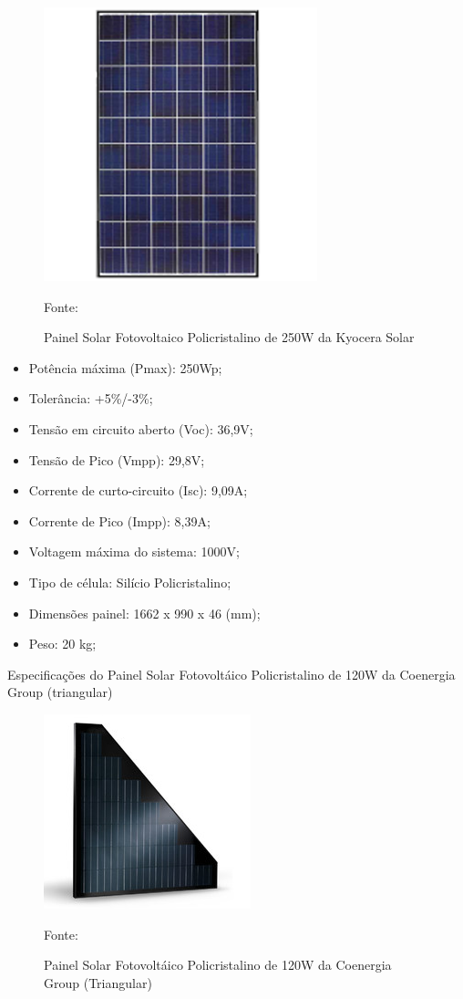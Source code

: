 \begin{figure}[H]
	\centering
	\label{Painel Solar Fotovoltaico Policristalino de 250W da Kyocera Solar}
		\includegraphics[keepaspectratio=true,scale=0.9]{solar/1.png}
	\caption{Painel Solar Fotovoltaico Policristalino de 250W da Kyocera Solar}
	\small{Fonte: \cite{KYOCERA}}
\end{figure}

\begin{itemize}
	\item Potência máxima (Pmax): 250Wp;
	\item Tolerância: +5\%/-3\%;
	\item Tensão em circuito aberto (Voc): 36,9V;
	\item Tensão de Pico (Vmpp): 29,8V;
	\item Corrente de curto-circuito (Isc): 9,09A;
	\item Corrente de Pico (Impp): 8,39A;
	\item Voltagem máxima do sistema: 1000V; 
	\item Tipo de célula: Silício Policristalino;
	\item Dimensões painel: 1662 x 990 x 46 (mm);
	\item Peso: 20 kg; 
\end{itemize}

Especificações do Painel Solar Fotovoltáico Policristalino de 120W da Coenergia Group (triangular)

\begin{figure}[H]
	\centering
	\label{Painel Solar Fotovoltáico Policristalino de 120W da Coenergia Group (Triangular)}
		\includegraphics[keepaspectratio=true,scale=0.9]{solar/2.png}
	\caption{Painel Solar Fotovoltáico Policristalino de 120W da Coenergia Group (Triangular)}
	\small{Fonte: \cite{KYOCERA}}
\end{figure}

